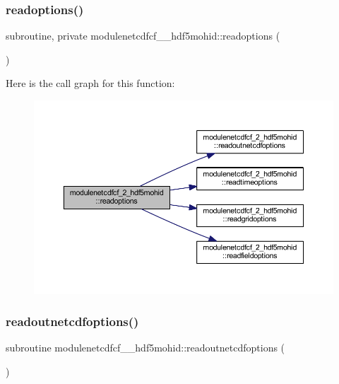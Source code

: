 \subsubsection{\texorpdfstring{readoptions()}{readoptions()}}
{\footnotesize\ttfamily subroutine, private modulenetcdfcf\+\_\+\_\+hdf5mohid\+::readoptions (\begin{DoxyParamCaption}{ }\end{DoxyParamCaption})\hspace{0.3cm}{\ttfamily [private]}}

Here is the call graph for this function\+:\nopagebreak
\begin{figure}[H]
\begin{center}
\leavevmode
\includegraphics[width=350pt]{namespacemodulenetcdfcf__2__hdf5mohid_aa120ed50c203e49fe912874719cd402d_cgraph}
\end{center}
\end{figure}
\mbox{\label{namespacemodulenetcdfcf__2__hdf5mohid_ae51ef08c6aac5023d3661f6ec659119a}} 
\subsubsection{\texorpdfstring{readoutnetcdfoptions()}{readoutnetcdfoptions()}}
{\footnotesize\ttfamily subroutine modulenetcdfcf\+\_\+\_\+hdf5mohid\+::readoutnetcdfoptions (\begin{DoxyParamCaption}{ }\end{DoxyParamCaption})\hspace{0.3cm}{\ttfamily [private]}}

